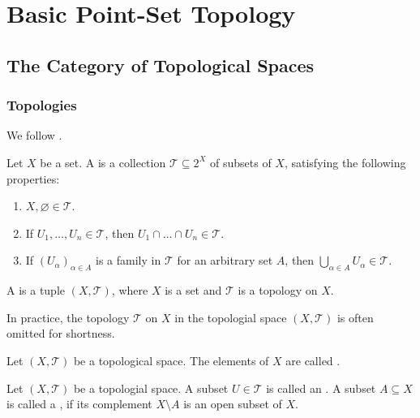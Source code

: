 \chapter{Basic Point-Set Topology}
\section*{The Category of Topological Spaces}
\subsection*{Topologies}
We follow \cite[20]{lee:topological_manifolds:2011}.

\begin{definition}[Topology]
	Let $X$ be a set. A  is a collection $\mathcal{T} \subseteq 2^X$ of subsets of $X$, satisfying the following properties:
	\begin{enumerate}[label = \textup{(}\roman*\textup{)},wide = 0pt]
		\item $X,\varnothing \in \mathcal{T}$.
		\item If $U_1,\dots,U_n \in \mathcal{T}$, then $U_1 \cap \dots \cap U_n \in \mathcal{T}$.
		\item If $(U_\alpha)_{\alpha \in A}$ is a family in $\mathcal{T}$ for an arbitrary set $A$, then $\bigcup_{\alpha \in A} U_\alpha \in \mathcal{T}$.
	\end{enumerate}
\end{definition}

\begin{definition}
	A  is a tuple $(X,\mathcal{T})$, where $X$ is a set and $\mathcal{T}$ is a topology on $X$.
\end{definition}

\begin{remark}
	In practice, the topology $\mathcal{T}$ on $X$ in the topologial space $(X,\mathcal{T})$ is often omitted for shortness.	
\end{remark}

\begin{definition}[Point]
	Let $(X,\mathcal{T})$ be a topological space. The elements of $X$ are called .
\end{definition}

\begin{definition}
	Let $(X,\mathcal{T})$ be a topologial space. A subset $U \in \mathcal{T}$ is called an . A subset $A \subseteq X$ is called a , if its complement $X \setminus A$ is an open subset of $X$. 
\end{definition}

